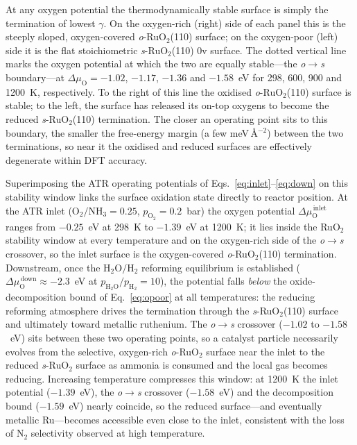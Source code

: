At any oxygen potential the thermodynamically stable surface is simply the
termination of lowest $\gamma$. On the oxygen-rich (right) side of each panel this
is the steeply sloped, oxygen-covered \textit{o}-RuO$_2$(110) surface; on the
oxygen-poor (left) side it is the flat stoichiometric \textit{s}-RuO$_2$(110)
0v surface. The dotted vertical line marks the oxygen potential at which the two are
equally stable---the \textit{o}$\rightarrow$\textit{s} boundary---at
$\Delta\mu_{\mathrm O}=-1.02$, $-1.17$, $-1.36$ and $-1.58$~eV for 298, 600, 900
and 1200~K, respectively. To the right of this line the oxidised
\textit{o}-RuO$_2$(110) surface is stable; to the left, the surface has released its
on-top oxygens to become the reduced \textit{s}-RuO$_2$(110) termination. The closer
an operating point sits to this boundary, the smaller the free-energy margin (a few
meV\,\AA$^{-2}$) between the two terminations, so near it the oxidised and reduced
surfaces are effectively degenerate within DFT accuracy.

Superimposing the ATR operating potentials of
Eqs.~\eqref{eq:inlet}--\eqref{eq:down} on this stability window links the surface
oxidation state directly to reactor position. At the ATR inlet
($\mathrm{O_2/NH_3}=0.25$, $p_{\mathrm{O_2}}=0.2$~bar) the oxygen potential
$\Delta\mu_{\mathrm O}^{\,\mathrm{inlet}}$ ranges from $-0.25$~eV at 298~K to
$-1.39$~eV at 1200~K; it lies inside the RuO$_2$ stability window at every
temperature and on the oxygen-rich side of the
\textit{o}$\rightarrow$\textit{s} crossover, so the inlet surface is the
oxygen-covered \textit{o}-RuO$_2$(110) termination. Downstream, once the
$\mathrm{H_2O/H_2}$ reforming equilibrium is established
($\Delta\mu_{\mathrm O}^{\,\mathrm{down}}\approx-2.3$~eV at
$p_{\mathrm{H_2O}}/p_{\mathrm{H_2}}=10$), the potential falls \emph{below} the
oxide-decomposition bound of Eq.~\eqref{eq:opoor} at all temperatures: the
reducing reforming atmosphere drives the termination through the
\textit{s}-RuO$_2$(110) surface and ultimately toward metallic ruthenium. The
\textit{o}$\rightarrow$\textit{s} crossover ($-1.02$ to $-1.58$~eV) sits between
these two operating points, so a catalyst particle necessarily evolves from the
selective, oxygen-rich \textit{o}-RuO$_2$ surface near the inlet to the reduced
\textit{s}-RuO$_2$ surface as ammonia is consumed and the local gas becomes
reducing. Increasing temperature compresses this window: at 1200~K the inlet
potential ($-1.39$~eV), the \textit{o}$\rightarrow$\textit{s} crossover
($-1.58$~eV) and the decomposition bound ($-1.59$~eV) nearly coincide, so the
reduced surface---and eventually metallic Ru---becomes accessible even close to
the inlet, consistent with the loss of N$_2$ selectivity observed at high
temperature.


